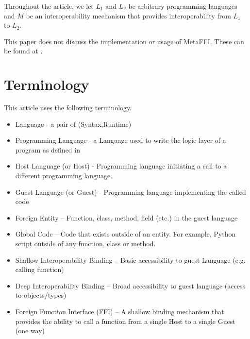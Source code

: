 \documentclass[sigplan,10pt,manuscript,nonacm]{acmart}
\begin{document}
Throughout the article, we let $L_1$ and $L_2$ be arbitrary programming languages and $M$ be an interoperability mechanism that provides interoperability from $L_1$ to $L_2$.

This paper does not discuss the implementation or usage of MetaFFI. These can be found at \cite{metaffi_paper}. 

\section{Terminology} \label{sec:terminology}

This article uses the following terminology.
\begin{itemize}
    \vspace{-2mm}\item Language - a pair of (Syntax,Runtime)
    \vspace{-2mm}\item Programming Language - a Language used to write the logic layer of a program as defined in \cite{empirical_multi_lingual}
    \vspace{-2mm}\item Host Language (or Host) - Programming language initiating a call to a different programming language.
    \vspace{-2mm}\item Guest Language (or Guest) - Programming language implementing the called code
    \vspace{-2mm}\item Foreign Entity – Function, class, method, field (etc.) in the guest language
    \vspace{-2mm}\item Global Code – Code that exists outside of an entity. For example, Python script outside of any function, class or method.
    \vspace{-2mm}\item Shallow Interoperability Binding – Basic accessibility to guest Language (e.g. calling function)
    \vspace{-2mm}\item Deep Interoperability Binding – Broad accessibility to guest language (access to objects/types)
    \vspace{-2mm}\item Foreign Function Interface (FFI) \cite{wiki_ffi} – A shallow binding mechanism that provides the ability to call a function from a single Host to a single Guest (one way)
    \begin{itemize}

\end{itemize}
\end{itemize}
\end{document}
